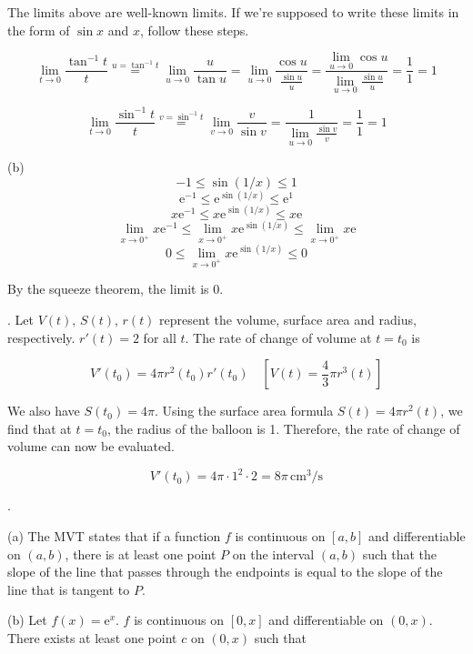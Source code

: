 \documentclass{article}
\begin{document}
\noindent The limits above are well-known limits. If we're supposed to write these limits in the form of $\sin x$ and $x$, follow these steps.

\[\lim_{t\to0}\frac{\tan^{-1} t}{t}\overset{u=\tan^{-1} t}{=}\lim_{u\to0}\frac u{\tan u} = \lim_{u\to0}\frac{\cos u}{\frac{\sin u}u}=\frac{\displaystyle \lim_{u\to0}\cos u}{\displaystyle\lim_{u\to0}\frac{\sin u}u} = \frac11 = 1\]

\[\lim_{t\to0}\frac{\sin^{-1} t}{t}\overset{v=\sin^{-1} t}{=}\lim_{v\to0}\frac v{\sin v} =\frac1{\displaystyle\lim_{u\to0}\frac{\sin v}v} = \frac11 = 1\]

\hfill

\noindent (b)
\[-1\leq\sin(1/x) \leq 1\]
\[\mathrm{e}^{-1}\leq\mathrm{e}^{\sin(1/x)} \leq \mathrm{e}^1\]
\[x\mathrm{e}^{-1}\leq x\mathrm{e}^{\sin(1/x)} \leq x\mathrm{e}\]
\[\lim_{x\to0^+}x\mathrm{e}^{-1}\leq \lim_{x\to0^+}x\mathrm{e}^{\sin(1/x)} \leq\lim_{x\to0^+}x\mathrm{e}\]
\[0\leq \lim_{x\to0^+}x\mathrm{e}^{\sin(1/x)} \leq0\]

\hfill

\noindent By the squeeze theorem, the limit is $\boxed{0}$.

\hfill

. Let $V(t),\,S(t),\,r(t)$ represent the volume, surface area and radius, respectively. $r'(t) = 2$ for all $t$. The rate of change of volume at $t=t_0$ is

\[V'(t_0) = 4\pi r^2(t_0)r'(t_0) \quad\left[V(t) = \frac43 \pi r^3(t)\right] \]

\hfill

\noindent We also have $S(t_0) = 4\pi$. Using the surface area formula $S(t) = 4\pi r^2(t)$, we find that at $t=t_0$, the radius of the balloon is 1. Therefore, the rate of change of volume can now be evaluated.

\[V'(t_0)=4\pi\cdot1^2\cdot2=\boxed{8\pi\,\text{cm}^3\text{/s}}\]

\newpage

.

\hfill

\noindent (a) The MVT states that if a function $f$ is continuous on $[a,b]$ and differentiable on $(a,b)$, there is at least one point $P$ on the interval $(a,b)$ such that the slope of the line that passes through the endpoints is equal to the slope of the line that is tangent to $P$.

\hfill

\noindent (b) Let $f(x)=\mathrm{e}^x$. $f$ is continuous on $[0,x]$ and differentiable on $(0,x)$.  There exists at least one point $c$ on $(0,x)$ such that
\end{document}
